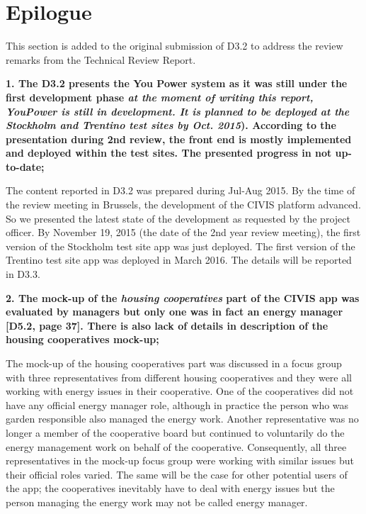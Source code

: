 \section{Epilogue}


This section is added to the original submission of D3.2 to address the review remarks from the Technical Review Report.  

\vspace{3mm}

\noindent\textbf{1. The D3.2 presents the You Power system as it was still under the first development phase \textit{at the moment of writing this report, YouPower is still in development. It is planned to be deployed at the Stockholm and Trentino test sites by Oct. 2015}). According to the presentation during 2nd review, the front end is mostly implemented and deployed within the test sites. The presented progress in not up-to-date;}
\vspace{3mm}

The content reported in D3.2 was prepared during Jul-Aug 2015. By the time of the review meeting in Brussels, the development of the CIVIS platform advanced. So we presented the latest state of the development as requested by the project officer. By November 19, 2015 (the date of the 2nd year review meeting), the first version of the Stockholm test site app was just deployed. The first version of the Trentino test site app was deployed in March 2016. The details will be reported in D3.3.
\vspace{3mm}

\noindent\textbf{2. The mock-up of the \textit{housing cooperatives} part of the CIVIS app was evaluated by managers but only one was in fact an energy manager [D5.2, page 37]. There is also lack of details in description of the housing cooperatives mock-up;}

\vspace{3mm}

The mock-up of the housing cooperatives part was discussed in a focus group with three representatives from different housing cooperatives and they were all working with energy issues in their cooperative. One of the cooperatives did not have any official energy manager role, although in practice the person who was garden responsible also managed the energy work. Another representative was no longer a member of the cooperative board but continued to voluntarily do the energy management work on behalf of the cooperative. Consequently, all three representatives in the mock-up focus group were working with similar issues but their official roles varied. The same will be the case for other potential users of the app; the cooperatives inevitably have to deal with energy issues but the person managing the energy work may not be called energy manager.

